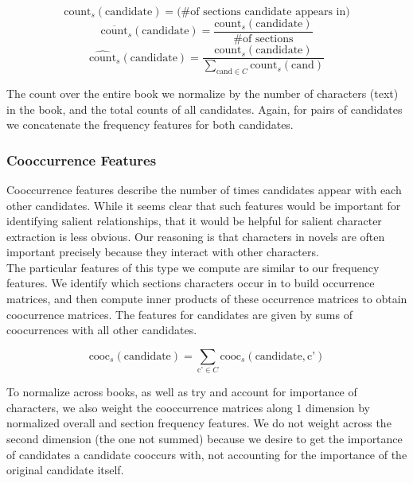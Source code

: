 \documentclass[12pt]{article}
\begin{document}
        \[\mbox{count}_s(\mbox{candidate}) = \mbox{(\# of sections candidate appears in)}\]
        \[\overline{\mbox{count}}_s(\mbox{candidate}) = \frac{\mbox{count}_s(\mbox{candidate})}{\mbox{\# of sections}}\]
        \[\hat{\mbox{count}}_s(\mbox{candidate}) = \frac{\mbox{count}_s(\mbox{candidate})}{\sum_{\mbox{cand}\in{C}}\mbox{count}_s(\mbox{cand})}\]

        The count over the entire book we normalize by the number of characters (text) in the book, and the total
        counts of all candidates. Again, for pairs of candidates we concatenate the frequency features for both
        candidates.

        \subsubsection{Cooccurrence Features}

        Cooccurrence features describe the number of times candidates appear with each other candidates. 
        While it seems clear that such features would be important for identifying salient relationships,
        that it would be helpful for salient character extraction is less obvious. Our reasoning is that 
        characters in novels are often important precisely because they interact with other
        characters. \\

        The particular features of this type we compute are similar to our frequency features. We identify
        which sections characters occur in to build occurrence matrices, and then compute inner products
        of these occurrence matrices to obtain coocurrence matrices. The features for candidates are
        given by sums of coocurrences with all other candidates. 

        \[\mbox{cooc}_s(\mbox{candidate}) = \sum_{\mbox{c'} \in C} \mbox{cooc}_s(\mbox{candidate}, \mbox{c'})\]

        To normalize across books, as well as try and account for importance of characters, we also
        weight the cooccurrence matrices along $1$ dimension by normalized overall and section frequency
        features. We do not weight across the second dimension (the one not summed) because we desire to
        get the importance of candidates a candidate cooccurs with, not accounting for the importance
        of the original candidate itself.

\end{document}
